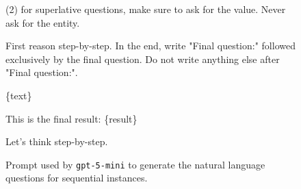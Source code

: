 \begin{figure}[t!]
\begin{tcolorbox}[
  title=Sequential question generation prompt,
  fonttitle=\bfseries,
  sharp corners=all,
]
(2) for superlative questions, make sure to ask for the value. Never ask for the entity.

\vspace{\baselineskip}
First reason step-by-step.
In the end, write "Final question:" followed exclusively by the final question. Do not write anything else after "Final question:".

\vspace{\baselineskip}
\{text\}
\vspace{\baselineskip}

This is the final result: \{result\}

Let's think step-by-step.

\end{tcolorbox}
\caption{Prompt used by \texttt{gpt-5-mini} to generate the natural language questions for sequential instances.}
\label{fig:seq_quest_prompt}
\end{figure}


